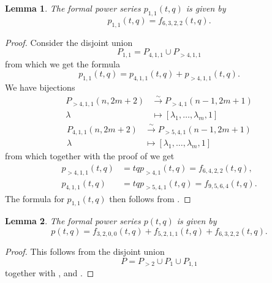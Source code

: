 \documentclass[12pt, a4paper]{article}
\newtheorem{lemma}{Lemma}
\begin{document}
\begin{lemma}
  \label{lmm:4}
  The formal power series $p_{1, 1}(t, q)$ is given by
  \begin{equation*}
    p_{1, 1}(t, q) = f_{6, 3, 2, 2}(t, q).
  \end{equation*}
\end{lemma}

\begin{proof}
  Consider the disjoint union
  \begin{equation*}
    P_{1, 1} = P_{4, 1, 1} \cup P_{>4, 1, 1}
  \end{equation*}
  from which we get the formula
  \begin{equation*}
    p_{1, 1}(t, q) = p_{4, 1, 1}(t, q) + p_{>4, 1, 1}(t, q).
  \end{equation*}
  We have bijections
  \begin{align*}
    P_{>4, 1, 1}(n, 2m + 2) &\xrightarrow{\sim} P_{>4, 1}(n - 1, 2m + 1) \\
    \lambda &\mapsto [\lambda_1, \dots, \lambda_m, 1]
  \end{align*}
  \begin{align*}
    P_{4, 1, 1}(n, 2m + 2) &\xrightarrow{\sim} P_{>5, 4, 1}(n - 1, 2m + 1) \\
    \lambda &\mapsto [\lambda_1, \dots, \lambda_m, 1]
  \end{align*}
  from which together with the proof of  we get
  \begin{align*}
    p_{>4, 1, 1}(t, q) &= tqp_{>4, 1}(t, q) = f_{6, 4, 2, 2}(t, q), \\
    p_{4, 1, 1}(t, q) &= tqp_{>5, 4, 1}(t, q) = f_{9, 5, 6, 4}(t, q).
  \end{align*}
  The formula for $p_{1, 1}(t, q)$ then follows from .
\end{proof}

\begin{lemma}
  \label{lmm:5}
  The formal power series $p(t, q)$ is given by
  \begin{equation*}
    p(t, q) = f_{3, 2, 0, 0}(t, q) + f_{5, 2, 1, 1}(t, q) + f_{6, 3, 2, 2}(t, q).
  \end{equation*}
\end{lemma}

\begin{proof}
  This follows from the disjoint union
  \begin{equation*}
    P = P_{>2} \cup P_{1} \cup P_{1, 1}
  \end{equation*}
  together with ,  and .
\end{proof}
\end{document}
